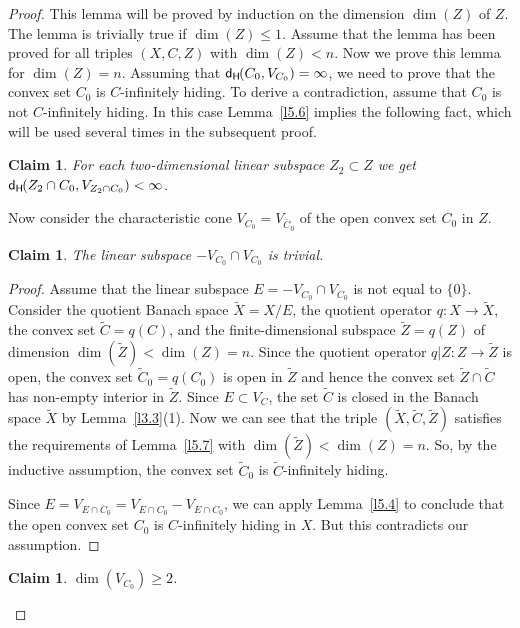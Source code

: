 \documentclass{amsart}
\newcommand{\dH}{\mathsf{d}_{\mathsf H}\kern-1pt}
\newtheorem{claim}[theorem]{Claim}
\theoremstyle{definition}
\begin{document}
\begin{proof} This lemma will be proved by induction on the dimension $\dim(Z)$ of $Z$. The lemma is trivially true if $\dim(Z)\le 1$. Assume that the lemma has been proved for all  triples $(X,C,Z)$ with $\dim(Z)<n$. Now we prove this lemma for $\dim(Z)=n$. Assuming that $\dH(C_0,V_{C_0})=\infty$, we need to prove that the convex set $C_0$ is $C$-infinitely hiding. To derive a contradiction, assume that $C_0$ is not $C$-infinitely hiding. In this case Lemma~\ref{l5.6} implies the following fact, which will be used several times in the subsequent proof.

\begin{claim}\label{cl5.8} For each two-dimensional linear subspace $Z_2\subset Z$ we get $\dH(Z_2\cap C_0,V_{Z_2\cap C_0})<\infty$.
\end{claim}

Now consider the characteristic cone $V_{C_0}=V_{\bar C_0}$ of the open convex set $C_0$ in $Z$.

\begin{claim} The linear subspace $-V_{C_0}\cap V_{C_0}$ is trivial.
\end{claim}

\begin{proof} Assume that the linear subspace $E=-V_{C_0}\cap V_{C_0}$ is not equal to $\{0\}$. Consider the quotient Banach space $\tilde X=X/E$, the quotient operator $q:X\to \tilde X$, the convex set $\tilde C=q(C)$, and the finite-dimensional subspace $\tilde Z=q(Z)$ of dimension $\dim(\tilde Z)<\dim(Z)=n$. Since the quotient operator $q|Z:Z\to\tilde Z$ is open, the convex set $\tilde C_0=q(C_0)$ is open in $\tilde Z$ and hence the convex set $\tilde Z\cap\tilde C$ has non-empty interior in $\tilde Z$. Since $E\subset V_C$, the set $\tilde C$ is closed in the Banach space $\tilde X$ by Lemma~\ref{l3.3}(1). Now we can see that the triple $(\tilde X,\tilde C,\tilde Z)$ satisfies the requirements of Lemma~\ref{l5.7} with $\dim(\tilde Z)<\dim(Z)=n$. So, by the inductive assumption, the convex set $\tilde C_0$ is $\tilde C$-infinitely hiding.

Since $E=V_{E\cap C_0}=V_{E\cap C_0}-V_{E\cap C_0}$, we can apply Lemma~\ref{l5.4} to conclude that the open convex  set $C_0$ is $C$-infinitely hiding in $X$. But this contradicts our assumption.
\end{proof}

\begin{claim} $\dim(V_{C_0})\ge 2$.
\end{claim}


\end{proof}
\end{document}
